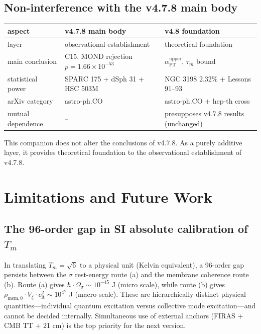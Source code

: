 \documentclass[11pt,a4paper]{article}
\newcommand{\Vxi}{V_{\xi}}
\newcommand{\Tm}{T_{m}}
\newcommand{\aPT}{\alpha_{\mathrm{PT}}}
\newcommand{\taum}{\tau_{m}}
\newcommand{\rhomem}{\rho_{\mathrm{mem},0}}
\newcommand{\clt}{c_{\mathrm{lt}}}
\begin{document}
\subsection{Non-interference with the v4.7.8 main body}
\begin{center}\small
\begin{tabular}{@{}lll@{}}
\toprule
aspect & v4.7.8 main body & v4.8 foundation \\
\midrule
layer & observational establishment & theoretical foundation \\
main conclusion & C15, MOND rejection $p = 1.66 \times 10^{-53}$ & $\aPT^{\mathrm{upper}}$, $\taum$ bound \\
statistical power & SPARC 175 + dSph 31 + HSC 503M & NGC 3198 2.32\% + Lessons 91--93 \\
arXiv category & astro-ph.CO & astro-ph.CO + hep-th cross \\
mutual dependence & -- & presupposes v4.7.8 results (unchanged) \\
\bottomrule
\end{tabular}
\end{center}

This companion does not alter the conclusions of v4.7.8. As a purely additive layer, it provides
theoretical foundation to the observational establishment of v4.7.8.

\section{Limitations and Future Work}

\subsection{The 96-order gap in SI absolute calibration of $\Tm$}
In translating $\Tm = \sqrt{6}$ to a physical unit (Kelvin equivalent), a 96-order gap persists
between the $\sigma$ rest-energy route (a) and the membrane coherence route (b). Route (a) gives
$\hbar \cdot \Omega_\sigma \sim 10^{-45}$ J (micro scale), while route (b) gives
$\rhomem \cdot \Vxi \cdot \clt^2 \sim 10^{47}$ J (macro scale). These are hierarchically distinct
physical quantities---individual quantum excitation versus collective mode excitation---and cannot
be decided internally. Simultaneous use of external anchors (FIRAS + CMB TT + 21 cm) is the top
priority for the next version.
\end{document}
